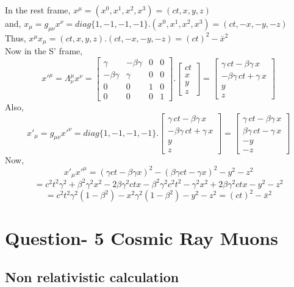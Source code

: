 \documentclass[11pt]{article}
\begin{document}
	In the rest frame, \(x^\mu = (x^0,x^1,x^2,x^3) = (ct,x,y,z)\)\\
	and, \(x_\mu = g_{\mu\nu} x^\nu = diag\{1,-1,-1,-1\} . (x^0,x^1,x^2,x^3) = (ct,-x,-y,-z) \)\\
	Thus, \(x^\mu x_\mu = (ct,x,y,z).(ct,-x,-y,-z) = (ct)^2 - \bar{x}^2\)\\
	Now in the S' frame, 
	\[
		 x'^\mu = \Lambda^\mu_\nu x^\nu= \begin{bmatrix}\gamma &-\beta\gamma&0&0\\-\beta\gamma&\gamma&0&0\\0&0&1&0\\0&0&0&1\end{bmatrix}. \begin{bmatrix}ct\\x\\y\\z\end{bmatrix} = \begin{bmatrix}\gamma \, ct - \beta\gamma \, x\\-\beta\gamma \, ct + \gamma \, x \\y\\z \end{bmatrix}
	\]	 
	Also,
	\[
		x'_\mu = g_{\mu\nu} x'^\nu = diag\{1,-1,-1,-1\}. \begin{bmatrix}\gamma \, ct - \beta\gamma \, x\\-\beta\gamma \, ct + \gamma \, x \\y\\z \end{bmatrix} = \begin{bmatrix}\gamma \, ct - \beta\gamma \, x\\\beta\gamma \, ct - \gamma \, x \\-y\\-z \end{bmatrix}
	\]
	Now,
	\[
		x'_\mu x'^\mu = (\gamma ct-\beta \gamma x)^2 - (\beta\gamma ct - \gamma x)^2 -y^2 - z^2 
	\]
	\[	
		=  c^2t^2\gamma^2+\beta^2\gamma^2x^2-2\beta\gamma^2 ctx -\beta^2\gamma^2 c^2 t^2 - \gamma^2 x^2 + 2\beta\gamma^2 ct x - y^2 - z^2 
	\]
	\[	
		= c^2t^2\gamma^2(1-\beta^2)-x^2\gamma^2(1-\beta^2)-y^2-z^2 = (ct)^2 - \bar{x}^2 
	\]
	
	\section{\color{teal} Question- 5 Cosmic Ray Muons}
	
	\subsection{Non relativistic calculation}
	
\end{document}
